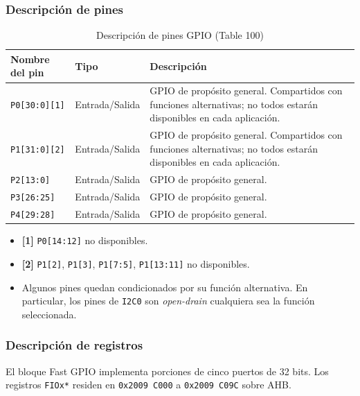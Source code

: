 \subsubsection{Descripción de pines}
\begin{table}[H]
  \centering
  \small
  \renewcommand{\arraystretch}{1.15}
  \setlength{\tabcolsep}{4pt}
  \caption{Descripción de pines GPIO (Table 100)}
  \begin{tabularx}{0.96\textwidth}{|>{\raggedright\arraybackslash}p{}|>{\raggedright\arraybackslash}p{}|>{\raggedright\arraybackslash}X|}
    \hline
    \textbf{Nombre del pin} & \textbf{Tipo} & \textbf{Descripción} \\
    \hline
    \texttt{P0[30:0][1]} & Entrada/Salida & GPIO de propósito general. Compartidos con funciones alternativas; no todos estarán disponibles en cada aplicación. \\
    \hline
    \texttt{P1[31:0][2]} & Entrada/Salida & GPIO de propósito general. Compartidos con funciones alternativas; no todos estarán disponibles en cada aplicación. \\
    \hline
    \texttt{P2[13:0]} & Entrada/Salida & GPIO de propósito general. \\
    \hline
    \texttt{P3[26:25]} & Entrada/Salida & GPIO de propósito general. \\
    \hline
    \texttt{P4[29:28]} & Entrada/Salida & GPIO de propósito general. \\
    \hline
  \end{tabularx}
\end{table}

\begin{itemize}
  \item \textbf{[1]} \texttt{P0[14:12]} no disponibles.
  \item \textbf{[2]} \texttt{P1[2]}, \texttt{P1[3]}, \texttt{P1[7:5]}, \texttt{P1[13:11]} no disponibles.
  \item Algunos pines quedan condicionados por su función alternativa. En particular, los pines de \texttt{I2C0} son \textit{open-drain} cualquiera sea la función seleccionada.
\end{itemize}

\subsubsection{Descripción de registros}
El bloque Fast GPIO implementa porciones de cinco puertos de 32 bits. Los registros \texttt{FIOx*} residen en \texttt{0x2009 C000} a \texttt{0x2009 C09C} sobre AHB.

